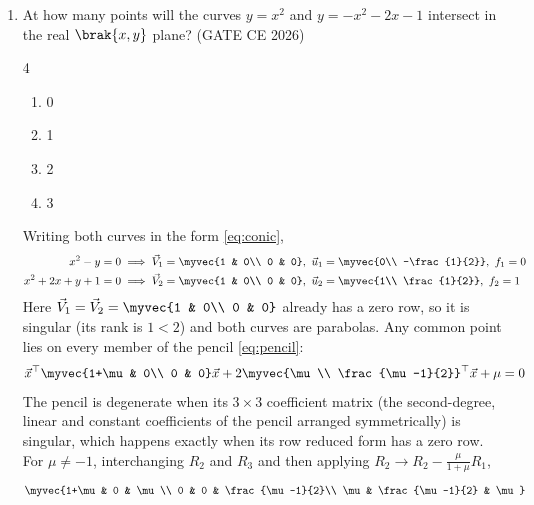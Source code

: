 

\begin{enumerate}[label=\thesubsection.\arabic*, ref=\thesubsection.\theenumi, itemsep=0pt, leftmargin=*]

\item At how many points will the curves $y = x^2$ and $y = -x^2 - 2x - 1$ intersect in the real $\brak{x,y}$ plane? \hfill (GATE CE 2026)
\begin{multicols}{4}
\begin{enumerate}[label=\alph*), itemsep=0pt]
\item 0
\item 1
\item 2
\item 3
\end{enumerate}
\end{multicols}
\solution Writing both curves in the form \eqref{eq:conic},
\begin{align}
x^2 - y = 0 &\implies \vec{V}_1 = \myvec{1 & 0\\ 0 & 0},\ \vec{u}_1 = \myvec{0\\ -\frac{1}{2}},\ f_1 = 0\\
x^2 + 2x + y + 1 = 0 &\implies \vec{V}_2 = \myvec{1 & 0\\ 0 & 0},\ \vec{u}_2 = \myvec{1\\ \frac{1}{2}},\ f_2 = 1
\end{align}
Here $\vec{V}_1 = \vec{V}_2 = \myvec{1 & 0\\ 0 & 0}$ already has a zero row, so it is singular (its rank is $1 < 2$) and both curves are parabolas. Any common point lies on every member of the pencil \eqref{eq:pencil}:
\begin{align}
\vec{x}^\top\myvec{1+\mu & 0\\ 0 & 0}\vec{x} + 2\myvec{\mu\\ \frac{\mu-1}{2}}^\top\vec{x} + \mu = 0
\end{align}
The pencil is degenerate when its $3\times 3$ coefficient matrix (the second-degree, linear and constant coefficients of the pencil arranged symmetrically) is singular, which happens exactly when its row reduced form has a zero row. For $\mu \ne -1$, interchanging $R_2$ and $R_3$ and then applying $R_2\to R_2 - \frac{\mu}{1+\mu}R_1$,
\begin{align}
\myvec{1+\mu & 0 & \mu\\ 0 & 0 & \frac{\mu-1}{2}\\ \mu & \frac{\mu-1}{2} & \mu}

\end{align}
\end{enumerate}
